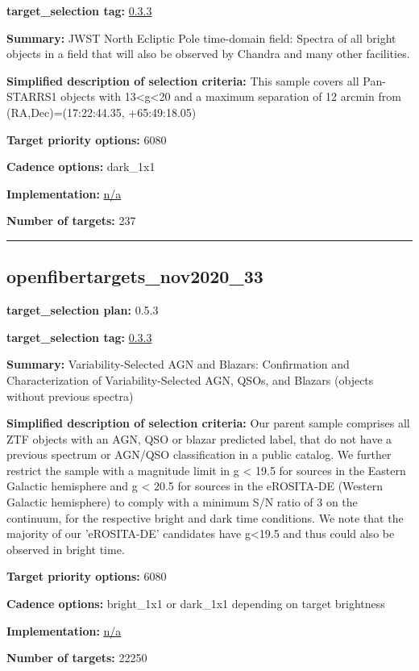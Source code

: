 \noindent\textbf{target\_selection tag:}
\href{https://github.com/sdss/target_selection/tree/0.3.3/}{0.3.3}

\noindent\textbf{Summary:} JWST North Ecliptic Pole time-domain field: Spectra of
all bright objects in a field that will also be observed by Chandra and
many other facilities.

\noindent\textbf{Simplified description of selection criteria:} This sample
covers all Pan-STARRS1 objects with 13\textless g\textless20 and a
maximum separation of 12 arcmin from (RA,Dec)=(17:22:44.35,
+65:49:18.05)


\noindent\textbf{Target priority options:} 6080

\noindent\textbf{Cadence options:} dark\_1x1

\noindent\textbf{Implementation:}
\href{https://github.com/sdss/target_selection/blob/0.3.3/python/target_selection/cartons/n/a}{n/a}

\noindent\textbf{Number of targets:} 237

\begin{center}\rule{0.5\linewidth}{0.5pt}\end{center}

\hypertarget{openfibertargets_nov2020_33_plan0.5.3}{%
\subsection{openfibertargets\_nov2020\_33}\label{openfibertargets_nov2020_33_plan0.5.3}}

\noindent\textbf{target\_selection plan:} 0.5.3

\noindent\textbf{target\_selection tag:}
\href{https://github.com/sdss/target_selection/tree/0.3.3/}{0.3.3}

\noindent\textbf{Summary:} Variability-Selected AGN and Blazars: Confirmation and
Characterization of Variability-Selected AGN, QSOs, and Blazars (objects
without previous spectra)

\noindent\textbf{Simplified description of selection criteria:} Our parent sample
comprises all ZTF objects with an AGN, QSO or blazar predicted label,
that do not have a previous spectrum or AGN/QSO classification in a
public catalog. We further restrict the sample with a magnitude limit in
g \textless{} 19.5 for sources in the Eastern Galactic hemisphere and g
\textless{} 20.5 for sources in the eROSITA-DE (Western Galactic
hemisphere) to comply with a minimum S/N ratio of 3 on the continuum,
for the respective bright and dark time conditions. We note that the
majority of our 'eROSITA-DE' candidates have g\textless19.5 and thus
could also be observed in bright time.


\noindent\textbf{Target priority options:} 6080

\noindent\textbf{Cadence options:} bright\_1x1 or dark\_1x1 depending on target
brightness

\noindent\textbf{Implementation:}
\href{https://github.com/sdss/target_selection/blob/0.3.3/python/target_selection/cartons/n/a}{n/a}

\noindent\textbf{Number of targets:} 22250
